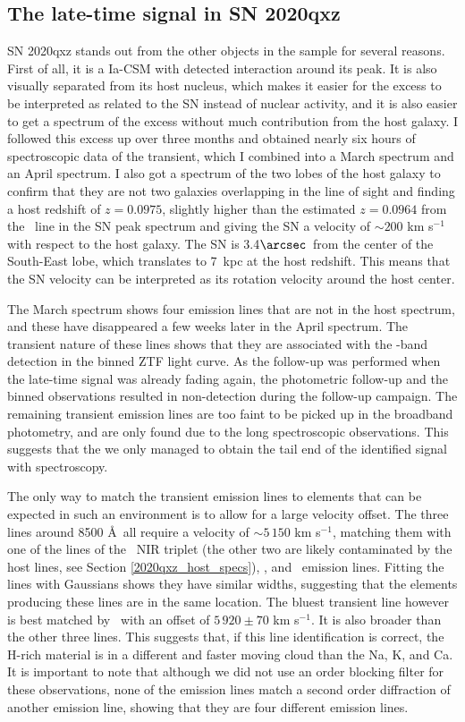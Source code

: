 \documentclass[a4paper,oneside,12pt, class=Latex/Classes/PhDthesisPSnPDF, crop=false]{standalone}
\begin{document}
\subsection{The late-time signal in SN 2020qxz}
\label{2020qzx_discussion}
SN 2020qxz stands out from the other objects in the sample for several reasons. First of all, it is a Ia-CSM with detected interaction around its peak. It is also visually separated from its host nucleus, which makes it easier for the excess to be interpreted as related to the SN instead of nuclear activity, and it is also easier to get a spectrum of the excess without much contribution from the host galaxy. I followed this excess up over three months and obtained nearly six hours of spectroscopic data of the transient, which I combined into a March spectrum and an April spectrum. I also got a spectrum of the two lobes of the host galaxy to confirm that they are not two galaxies overlapping in the line of sight and finding a host redshift of $z=0.0975$, slightly higher than the estimated $z=0.0964$ from the \Halpha\ line in the SN peak spectrum and giving the SN a velocity of $\sim200$ km s$^{-1}$ with respect to the host galaxy. The SN is 3.4$\arcsec$\ from the center of the South-East lobe, which translates to 7~kpc at the host redshift. This means that the SN velocity can be interpreted as its rotation velocity around the host center.

The March spectrum shows four emission lines that are not in the host spectrum, and these have disappeared a few weeks later in the April spectrum. The transient nature of these lines shows that they are associated with the \ztfi-band detection in the binned ZTF light curve. As the follow-up was performed when the late-time signal was already fading again, the photometric follow-up and the binned observations resulted in non-detection during the follow-up campaign. The remaining transient emission lines are too faint to be picked up in the broadband photometry, and are only found due to the long spectroscopic observations. This suggests that the we only managed to obtain the tail end of the identified signal with spectroscopy. 

The only way to match the transient emission lines to elements that can be expected in such an environment is to allow for a large velocity offset. The three lines around 8500 \AA\ all require a velocity of $\sim5\,150$ km s$^{-1}$, matching them with one of the lines of the \CaII\ NIR triplet (the other two are likely contaminated by the host lines, see Section \ref{2020qxz_host_specs}), \NI, and \KI\ emission lines. Fitting the lines with Gaussians shows they have similar widths, suggesting that the elements producing these lines are in the same location. The bluest transient line however is best matched by \Hbeta\ with an offset of $5\,920\pm70$ km s$^{-1}$. It is also broader than the other three lines. This suggests that, if this line identification is correct, the H-rich material is in a different and faster moving cloud than the Na, K, and Ca. It is important to note that although we did not use an order blocking filter for these observations, none of the emission lines match a second order diffraction of another emission line, showing that they are four different emission lines.
\end{document}
